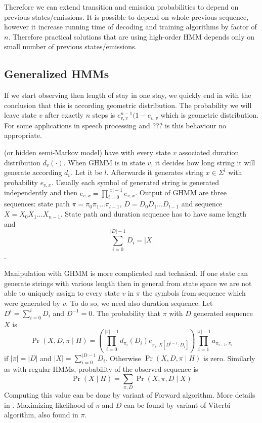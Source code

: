 Therefore we can extend transition and emission probabilities to depend on
previous states/emissions. It is possible to depend on whole previous sequence,
however it increase running time of decoding and training algorithms by factor
of $n$. Therefore practical solutions that are using high-order HMM depends only
on small number of previous states/emissions.

\subsection{Generalized HMMs}

If we start observing then length of stay in one stay, we quickly end in 
with the conclusion that this is according geometric distribution.
The probability we will leave state $v$ after exactly $n$ steps is
$e_{v,v}^{n-1}(1-e_{v,v}$ which is geometric distribution. For some
applications in speech processing and ??? is this behaviour no appropriate.

 (or hidden semi-Markov model)
have with every state $v$ associated duration distribution $d_v(\cdot)$.  When
GHMM is in state $v$, it decides how long string it will generate according
$d_v$. Let it be $l$. Afterwards it generates string $x\in\Sigma^l$ with
probability $e_{v,x}$. Usually each symbol of generated string is generated
independently and then $e_{v,x}=\prod_{i=0}^{|x|-1}e_{v,x}$. Output of GHMM are
three sequences: state path $\pi=\pi_0\pi_1\dots\pi_{l-1}$,  $D=D_0D_1\dots D_{l-1}$ and sequence $X=X_0X_1\dots X_{n-1}$.  State
path and duration sequence has to have same length and \[\sum_{i=0}^{|D|-1}D_i =
|X|\].

Manipulation with GHMM is  more complicated and technical. If one state can
generate strings with various length then in general from state space we are
not able to uniquely assign to every state $v$ in $\pi$ the symbols from
sequence which were generated by $v$. To do so, we need also duration sequence.
Let $D^i = \sum_{i=0}^{i}D_i$ and $D^{-1}=0$.
The probability that $\pi$ with $D$ generated sequence $X$ is
\begin{equation}
\Pr(X,D,\pi\mid H) = 
\left(
\prod_{i=0}^{|\pi|-1}
d_{\pi_i}(D_i)e_{\pi_i,X[D^{i-1}:D_i]}
\right)
\prod_{i=1}^{|\pi|-1}
a_{\pi_{i-1},\pi_i}
\end{equation}
if $|\pi|=|D|$ and $|X|=\sum_{i=0}^{|D-1}D_i$. Otherwise $\Pr\left(X,D,\pi\mid
H\right)$ is zero. Similarly as with regular HMMs,  probability of the observed
sequence is
\begin{equation}
\Pr\left(X\mid H\right) = \sum_{\pi,D}\Pr\left(X,\pi,D\mid X\right)
\end{equation}
Computing this value can be done by variant of Forward algorithm. More details
in \cite{}. Maximizing likelihood of $\pi$ and $D$ can be found by variant of
Viterbi algorithm, also found in $\pi$.

